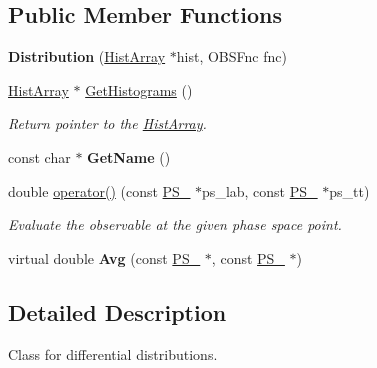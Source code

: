 \subsection*{Public Member Functions}
\begin{DoxyCompactItemize}
\item 
\hypertarget{classDistribution_aa7269a89c1c603c957891f49af7542e4}{}{\bfseries Distribution} (\hyperlink{classHistArray}{Hist\+Array} $\ast$hist, O\+B\+S\+Fnc fnc)\label{classDistribution_aa7269a89c1c603c957891f49af7542e4}

\item 
\hypertarget{classDistribution_a49dc0f91394f9adf82f8485ba9e12a6c}{}\hyperlink{classHistArray}{Hist\+Array} $\ast$ \hyperlink{classDistribution_a49dc0f91394f9adf82f8485ba9e12a6c}{Get\+Histograms} ()\label{classDistribution_a49dc0f91394f9adf82f8485ba9e12a6c}

\begin{DoxyCompactList}\small\item\em Return pointer to the \hyperlink{classHistArray}{Hist\+Array}. \end{DoxyCompactList}\item 
\hypertarget{classDistribution_ae5b5001def9ff1fadb0d9f34bcd3f2b4}{}const char $\ast$ {\bfseries Get\+Name} ()\label{classDistribution_ae5b5001def9ff1fadb0d9f34bcd3f2b4}

\item 
double \hyperlink{classDistribution_ae87b192a060ec4aed233940a2b9b060e}{operator()} (const \hyperlink{classPS__2}{P\+S\+\_} $\ast$ps\+\_\+lab, const \hyperlink{classPS__2}{P\+S\+\_} $\ast$ps\+\_\+tt)
\begin{DoxyCompactList}\small\item\em Evaluate the observable at the given phase space point. \end{DoxyCompactList}\item 
\hypertarget{classDistribution_a5f4c4f1a300f700e33ed3a09e2eab3be}{}virtual double {\bfseries Avg} (const \hyperlink{classPS__2}{P\+S\+\_} $\ast$, const \hyperlink{classPS__2}{P\+S\+\_} $\ast$)\label{classDistribution_a5f4c4f1a300f700e33ed3a09e2eab3be}

\end{DoxyCompactItemize}


\subsection{Detailed Description}
Class for differential distributions. 

